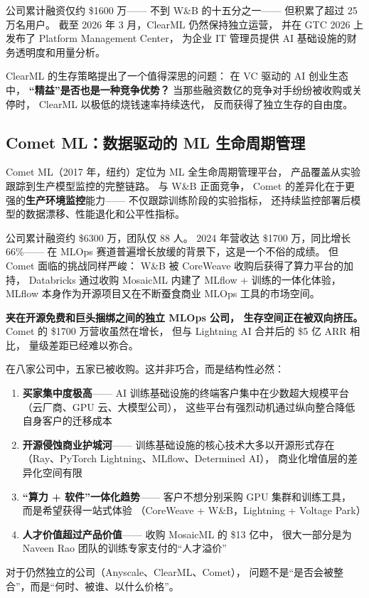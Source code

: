 公司累计融资仅约 \$1600 万——
不到 W\&B 的十五分之一——
但积累了超过 25 万名用户。
截至 2026 年 3 月，ClearML 仍然保持独立运营，
并在 GTC 2026 上发布了 Platform Management Center，
为企业 IT 管理员提供 AI 基础设施的财务透明度和用量分析。

ClearML 的生存策略提出了一个值得深思的问题：
在 VC 驱动的 AI 创业生态中，
\textbf{``精益''是否也是一种竞争优势？}
当那些融资数亿的竞争对手纷纷被收购或关停时，
ClearML 以极低的烧钱速率持续迭代，
反而获得了独立生存的自由度。


\subsection{Comet ML：数据驱动的 ML 生命周期管理}

Comet ML（2017 年，纽约）定位为 ML 全生命周期管理平台，
产品覆盖从实验跟踪到生产模型监控的完整链路。
与 W\&B 正面竞争，
Comet 的差异化在于更强的\textbf{生产环境监控}能力——
不仅跟踪训练阶段的实验指标，
还持续监控部署后模型的数据漂移、性能退化和公平性指标。

公司累计融资约 \$6300 万，团队仅 88 人。
2024 年营收达 \$1700 万，同比增长 66\%——
在 MLOps 赛道普遍增长放缓的背景下，这是一个不俗的成绩。
但 Comet 面临的挑战同样严峻：
W\&B 被 CoreWeave 收购后获得了算力平台的加持，
Databricks 通过收购 MosaicML 内建了 MLflow + 训练的一体化体验，
MLflow 本身作为开源项目又在不断蚕食商业 MLOps 工具的市场空间。

\textbf{夹在开源免费和巨头捆绑之间的独立 MLOps 公司，
生存空间正在被双向挤压。}
Comet 的 \$1700 万营收虽然在增长，
但与 Lightning AI 合并后的 \$5 亿 ARR 相比，
量级差距已经难以弥合。


\begin{whybox}[为什么训练基础设施赛道被大规模整合？]
在八家公司中，五家已被收购。这并非巧合，而是结构性必然：

\begin{enumerate}[noitemsep]
  \item \textbf{买家集中度极高}——
        AI 训练基础设施的终端客户集中在少数超大规模平台
        （云厂商、GPU 云、大模型公司），
        这些平台有强烈动机通过纵向整合降低自身客户的迁移成本
  \item \textbf{开源侵蚀商业护城河}——
        训练基础设施的核心技术大多以开源形式存在
        （Ray、PyTorch Lightning、MLflow、Determined AI），
        商业化增值层的差异化空间有限
  \item \textbf{``算力 + 软件''一体化趋势}——
        客户不想分别采购 GPU 集群和训练工具，
        而是希望获得一站式体验
        （CoreWeave + W\&B，Lightning + Voltage Park）
  \item \textbf{人才价值超过产品价值}——
        收购 MosaicML 的 \$13 亿中，
        很大一部分是为 Naveen Rao 团队的训练专家支付的``人才溢价''
\end{enumerate}

对于仍然独立的公司（Anyscale、ClearML、Comet），
问题不是``是否会被整合''，而是``何时、被谁、以什么价格''。
\end{whybox}

